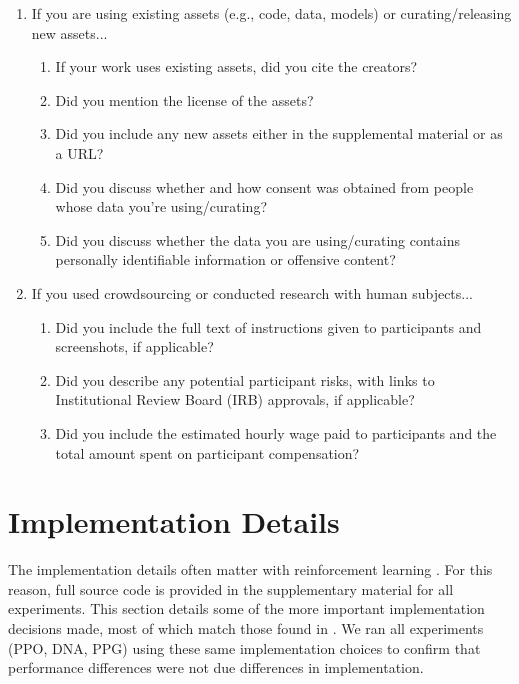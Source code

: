 \documentclass{article}
\begin{document}
\begin{enumerate}
\item If you are using existing assets (e.g., code, data, models) or curating/releasing new assets...
\begin{enumerate}
  \item If your work uses existing assets, did you cite the creators?
    \answerNA{}
  \item Did you mention the license of the assets?
    \answerNA{}
  \item Did you include any new assets either in the supplemental material or as a URL?
    \answerNA{}
  \item Did you discuss whether and how consent was obtained from people whose data you're using/curating?
    \answerNA{}
  \item Did you discuss whether the data you are using/curating contains personally identifiable information or offensive content?
    \answerNA{}
\end{enumerate}


\item If you used crowdsourcing or conducted research with human subjects...
\begin{enumerate}
  \item Did you include the full text of instructions given to participants and screenshots, if applicable?
    \answerNA{}
  \item Did you describe any potential participant risks, with links to Institutional Review Board (IRB) approvals, if applicable?
    \answerNA{}
  \item Did you include the estimated hourly wage paid to participants and the total amount spent on participant compensation?
    \answerNA{}
\end{enumerate}


\end{enumerate}

\fi



\newpage

\appendix

\section{Implementation Details}

The implementation details often matter with reinforcement learning \cite{engstrom2019implementation}. For this reason, full source code is provided in the supplementary material for all experiments. This section details some of the more important implementation decisions made, most of which match those found in \cite{andrychowicz2020matters}. We ran all experiments (PPO, DNA, PPG) using these same implementation choices to confirm that performance differences were not due differences in implementation.
\end{document}
